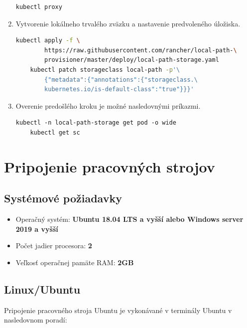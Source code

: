 \begin{enumerate}
{\begin{lstlisting}[language=Bash,basicstyle=\footnotesize]
    kubectl proxy
\end{lstlisting}}
\item{\noindent Vytvorenie lokálneho trvalého zväzku a nastavenie predvoleného úložiska.
\begin{lstlisting}[language=Bash,basicstyle=\footnotesize]
    kubectl apply -f \
        https://raw.githubusercontent.com/rancher/local-path-\
        provisioner/master/deploy/local-path-storage.yaml
    kubectl patch storageclass local-path -p'\
        {"metadata":{"annotations":{"storageclass.\
        kubernetes.io/is-default-class":"true"}}}'
\end{lstlisting}}
\item{\noindent Overenie predošlého kroku je možné nasledovnými príkazmi.
\begin{lstlisting}[basicstyle=\footnotesize]
    kubectl -n local-path-storage get pod -o wide
    kubectl get sc
\end{lstlisting}}
\end{enumerate}

\section{Pripojenie pracovných strojov}

\subsection*{Systémové požiadavky}

\begin{itemize}
    \item Operačný systém: \textbf{Ubuntu 18.04 LTS a vyšší alebo Windows server 2019 a vyšší}
	\item Počet jadier procesora: \textbf{2}
    \item Veľkosť operačnej pamäte RAM: \textbf{2GB}
\end{itemize}

\subsection*{Linux/Ubuntu}

Pripojenie pracovného stroja Ubuntu je vykonávané v terminály Ubuntu v nasledovnom poradí:

